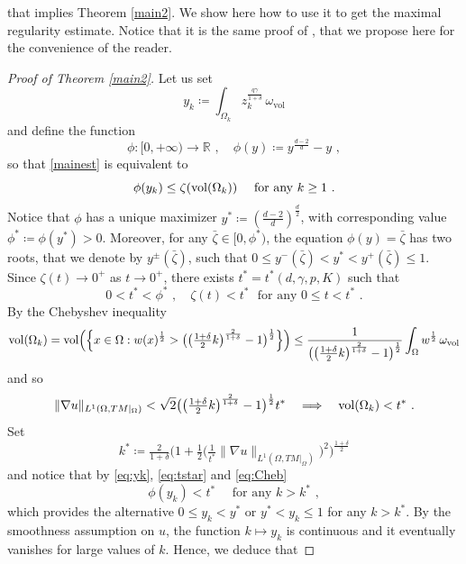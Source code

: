 \documentclass[10pt, a4paper, reqno, oneside]{amsart}
\theoremstyle{plain}
\theoremstyle{definition}
\theoremstyle{plain}
\theoremstyle{definition}
\theoremstyle{plain}
\renewcommand{\=}{:=}
\begin{document}
\noindent that implies Theorem \ref{main2}. We show here how to use it to get the maximal regularity estimate. Notice that it is the same proof of \cite{CGell}, that we propose here for the convenience of the reader.

\begin{proof}[Proof of Theorem \ref{main2}]
Let us set
$$
y_k \coloneqq \int_{\Omega_k} z_k^{\frac{q\gamma}{1+\delta}}\, \omega_{\mathrm{vol}}
$$
and define the function
$$
\phi: [0,+\infty) \to \mathbb{R} \,\, , \quad \phi(y) \coloneqq y^{\frac{d-2}{d}}-y \,\, ,
$$
so that \eqref{mainest} is equivalent to
\begin{equation} \label{eq:yk}
\phi(y_k) \leq \zeta ({\rm vol}(\Omega_k)) \quad \text{ for any } k\geq1 \,\, .
\end{equation}
Notice that $\phi$ has a unique maximizer $y^* \coloneqq (\frac{d-2}{d})^{\frac{d}{2}}$, with corresponding value $\phi^* \coloneqq \phi(y^*) >0$. Moreover, for any $\bar{\zeta} \in [0,\phi^*)$, the equation $\phi(y)=\bar{\zeta}$ has two roots, that we denote by $y^{\pm}(\bar{\zeta})$, such that $0 \leq y^{-}(\bar{\zeta}) < y^* < y^{+}(\bar{\zeta}) \leq 1$. Since $\zeta(t) \to 0^+$ as $t \to 0^+$, there exists $t^*=t^*(d,\gamma,p,K)$ such that
\begin{equation} \label{eq:tstar}
0 < t^* < \phi^* \,\, , \quad \zeta(t)<t^* \,\, \text{ for any } 0\leq t<t^* \,\, .
\end{equation}
By the Chebyshev inequality \cite[p.6]{Bogachev}
$$
{\rm vol}(\Omega_k) = {\rm vol}\Big(\Big\{x \in \Omega : w(x)^{\frac12} > \big(\big(\tfrac{1+\delta}2k\big)^{\frac2{1+\delta}}-1\big)^{\frac12}\Big\}\Big) \leq \frac1{\big(\big(\tfrac{1+\delta}2k\big)^{\frac2{1+\delta}}-1\big)^{\frac12}}\int_{\Omega} w^{\frac12}\, \omega_{\mathrm{vol}}
$$
and so
\begin{equation} \label{eq:Cheb}
\|\nabla u\|_{L^1(\Omega,TM|_{\Omega})} < \sqrt{2}\big(\big(\tfrac{1+\delta}2k\big)^{\frac2{1+\delta}}-1\big)^{\frac12}t^* \quad \Longrightarrow \quad {\rm vol}(\Omega_k) < t^* \,\, .
\end{equation}
Set
$$
k^* \coloneqq \tfrac2{1+\delta}\Big(1+\tfrac12\big(\tfrac1{t^*}\|\nabla u\|_{L^1(\Omega,TM|_{\Omega})}\big)^2\Big)^{\frac{1+\delta}2}
$$
and notice that by \eqref{eq:yk}, \eqref{eq:tstar} and \eqref{eq:Cheb}
$$
\phi(y_k) < t^* \quad \text{ for any } k > k^* \,\, ,
$$
which provides the alternative $0 \leq y_k < y^*$ or $y^* < y_k \leq 1$ for any $k > k^*$. By the smoothness assumption on $u$, the function $k \mapsto y_k$ is continuous and it eventually vanishes for large values of $k$. Hence, we deduce that

\end{proof}
\end{document}
